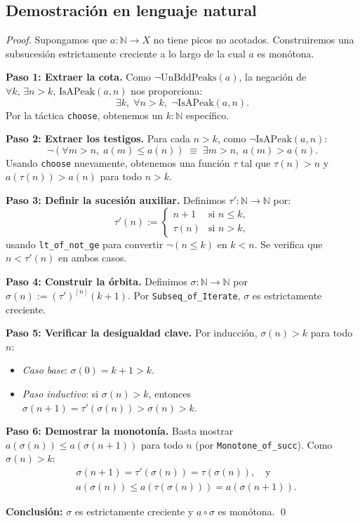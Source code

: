 \subsection{Demostración en lenguaje natural}

\begin{proof}
Supongamos que $a : \mathbb{N} \to X$ no tiene picos no acotados.
Construiremos una subsucesión estrictamente creciente a lo largo de la cual
$a$ es monótona.

\medskip
\textbf{Paso 1: Extraer la cota.}
Como $\lnot\mathrm{UnBddPeaks}(a)$, la negación de
$\forall k,\,\exists n>k,\,\mathrm{IsAPeak}(a,n)$ nos proporciona:
\[
  \exists k,\;\forall n > k,\;\lnot\mathrm{IsAPeak}(a,n).
\]
Por la táctica \texttt{choose}, obtenemos un $k:\mathbb{N}$ específico.

\medskip
\textbf{Paso 2: Extraer los testigos.}
Para cada $n > k$, como $\lnot\mathrm{IsAPeak}(a,n)$:
\[
  \lnot(\forall m>n,\;a(m)\leq a(n))
  \;\equiv\;
  \exists m>n,\;a(m)>a(n).
\]
Usando \texttt{choose} nuevamente, obtenemos una función $\tau$ tal que
$\tau(n)>n$ y $a(\tau(n))>a(n)$ para todo $n>k$.

\medskip
\textbf{Paso 3: Definir la sucesión auxiliar.}
Definimos $\tau':\mathbb{N}\to\mathbb{N}$ por:
\[
  \tau'(n):=\begin{cases}n+1&\text{si }n\leq k,\\\tau(n)&\text{si }n>k,\end{cases}
\]
usando \texttt{lt\_of\_not\_ge} para convertir $\lnot(n\leq k)$ en $k<n$.
Se verifica que $n < \tau'(n)$ en ambos casos.

\medskip
\textbf{Paso 4: Construir la órbita.}
Definimos $\sigma:\mathbb{N}\to\mathbb{N}$ por
$\sigma(n):=(\tau')^{[n]}(k+1)$.
Por \texttt{Subseq\_of\_Iterate}, $\sigma$ es estrictamente creciente.

\medskip
\textbf{Paso 5: Verificar la desigualdad clave.}
Por inducción, $\sigma(n)>k$ para todo $n$:
\begin{itemize}
  \item \textit{Caso base}: $\sigma(0)=k+1>k$.
  \item \textit{Paso inductivo}: si $\sigma(n)>k$, entonces
        $\sigma(n+1)=\tau'(\sigma(n))>\sigma(n)>k$.
\end{itemize}

\medskip
\textbf{Paso 6: Demostrar la monotonía.}
Basta mostrar $a(\sigma(n))\leq a(\sigma(n+1))$ para todo $n$
(por \texttt{Monotone\_of\_succ}). Como $\sigma(n)>k$:
\begin{align*}
  &\sigma(n+1)=\tau'(\sigma(n))=\tau(\sigma(n)), \quad \text{y}\quad\\
  &a(\sigma(n))\leq a(\tau(\sigma(n)))=a(\sigma(n+1)).
\end{align*}

\textbf{Conclusión:} $\sigma$ es estrictamente creciente y $a\circ\sigma$ es
monótona. \qed
\end{proof}

